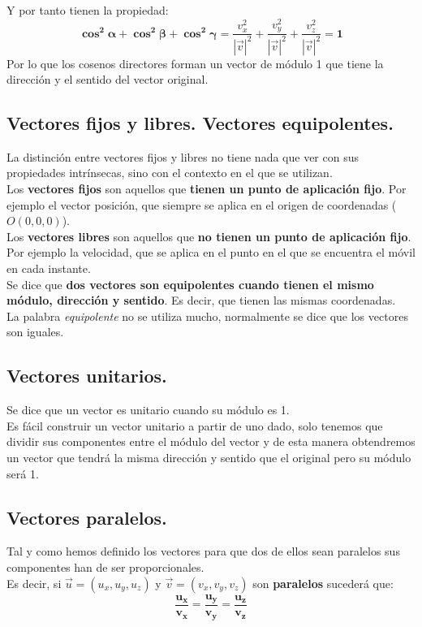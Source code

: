 \documentclass[a4paper,11pt,answers]{exam}
\begin{document}
Y por tanto tienen la propiedad:
\[\boldsymbol{\cos^2 \alpha + \cos^2 \beta + \cos^2 \gamma} =
\frac{v_x^2}{|\vec v|^2} + \frac{v_y^2}{|\vec v|^2} + \frac{v_z^2}{|\vec v|^2} = \boldsymbol{1}\]
Por lo que los cosenos directores forman un vector de módulo 1 que tiene la dirección y el sentido del vector original.
\subsection{Vectores fijos y libres. Vectores equipolentes.}
La distinción entre vectores fijos y libres no tiene nada que ver con sus propiedades intrínsecas, sino con el contexto en el que se utilizan.\\
Los \textbf{vectores fijos} son aquellos que \textbf{tienen un punto de aplicación fijo}. Por ejemplo el vector posición, que siempre se aplica en el origen de coordenadas ($O(0,0,0)$).\\
Los \textbf{vectores libres} son aquellos que \textbf{no tienen un punto de aplicación fijo}. Por ejemplo la velocidad, que se aplica en el punto en el que se encuentra el móvil en cada instante.\\

Se dice que \textbf{dos vectores son equipolentes cuando tienen el mismo módulo, dirección y sentido}. Es decir, que tienen las mismas coordenadas.\\
La palabra \emph{equipolente} no se utiliza mucho, normalmente se dice que los vectores son iguales.

\subsection{Vectores unitarios.}
Se dice que un vector es unitario cuando su módulo es 1.\\

Es fácil construir un vector unitario a partir de uno dado, solo tenemos que dividir sus componentes entre el módulo del vector y de esta manera obtendremos un vector que tendrá la misma dirección y sentido que el original pero su módulo será 1.

\subsection{Vectores paralelos.}
Tal y como hemos definido los vectores para que dos de ellos sean paralelos sus componentes han de ser proporcionales.\\
Es decir, si $\vec{u} = (u_x, u_y, u_z)$ y $\vec{v} = (v_x, v_y, v_z)$ son \textbf{paralelos} sucederá que:
\[\boldsymbol{\frac{u_x}{v_x} = \frac{u_y}{v_y} = \frac{u_z}{v_z}}\]
\end{document}
